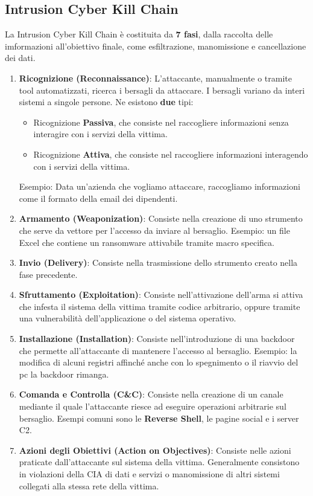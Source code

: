 \documentclass{article}
\begin{document}
\subsection{Intrusion Cyber Kill Chain}
La Intrusion Cyber Kill Chain è costituita da \textbf{7 fasi}, dalla raccolta delle imformazioni all'obiettivo finale, come esfiltrazione, manomissione e cancellazione dei dati.
\begin{enumerate}
    \item \textbf{Ricognizione (Reconnaissance)}: L'attaccante, manualmente o tramite tool automatizzati, ricerca i bersagli da attaccare. I bersagli variano da interi sistemi a singole persone.
    Ne esistono \textbf{due} tipi:
    \begin{itemize}
        \item Ricognizione \textbf{Passiva}, che consiste nel raccogliere informazioni senza interagire con i servizi della vittima.
        \item Ricognizione \textbf{Attiva}, che consiste nel raccogliere informazioni interagendo con i servizi della vittima.
    \end{itemize}
    Esempio: Data un'azienda che vogliamo attaccare, raccogliamo informazioni come il formato della email dei dipendenti.

    \item \textbf{Armamento (Weaponization)}: Consiste nella creazione di uno strumento che serve da vettore per l'accesso da inviare al bersaglio. Esempio: un file Excel che contiene un ransomware attivabile tramite macro specifica.

    \item \textbf{Invio (Delivery)}: Consiste nella trasmissione dello strumento creato nella fase precedente.

    \item \textbf{Sfruttamento (Exploitation)}: Consiste nell'attivazione dell'arma si attiva che infesta il sistema della vittima tramite codice arbitrario, oppure tramite una vulnerabilità dell'applicazione o del sistema operativo.

    \item \textbf{Installazione (Installation)}: Consiste nell'introduzione di una backdoor che permette all'attaccante di mantenere l'accesso al bersaglio. Esempio: la modifica di alcuni registri affinché anche con lo spegnimento o il riavvio del pc la backdoor rimanga.

    \item \textbf{Comanda e Controlla (C\&C)}: Consiste nella creazione di un canale mediante il quale l'attaccante riesce ad eseguire operazioni arbitrarie sul bersaglio. Esempi comuni sono le \textbf{Reverse Shell}, le pagine social e i server C2.
    
    \item \textbf{Azioni degli Obiettivi (Action on Objectives)}: Consiste nelle azioni praticate dall'attaccante sul sistema della vittima. Generalmente consistono in violazioni della CIA di dati e servizi o manomissione di altri sistemi collegati alla stessa rete della vittima.
\end{enumerate}
\end{document}
